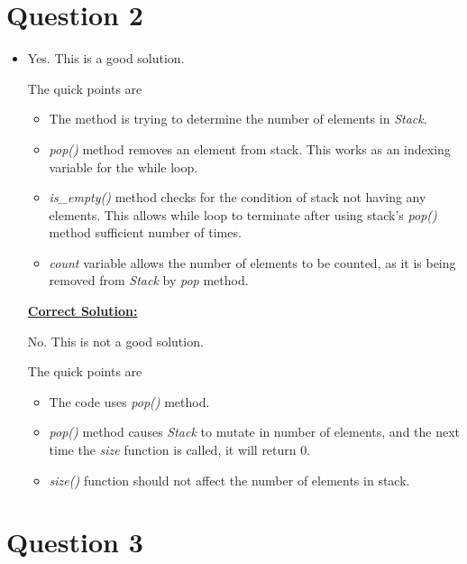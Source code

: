 \documentclass[12pt]{article}
\begin{document}
\section*{Question 2}
\begin{itemize}
    \item

    Yes. This is a good solution.

    \bigskip

    The quick points are

    \begin{itemize}
        \item The method is trying to determine the number of elements in \textit{Stack}.
        \item \textit{pop()} method removes an element from stack. This works as an indexing variable for the while loop.
        \item \textit{is\_empty()} method checks for the condition of stack not having any elements.
        This allows while loop to terminate after using stack's \textit{pop()} method sufficient number of times.
        \item \textit{count} variable allows the number of elements to be counted, as it is being
        removed from \textit{Stack} by \textit{pop} method.
    \end{itemize}

    \bigskip

    \begin{mdframed}
        \underline{\textbf{Correct Solution:}}

        \bigskip
        \color{red}
        No. This is not a good solution.
        \color{black}

        \bigskip

        The quick points are

        \color{red}
        \begin{itemize}
            \item The code uses \textit{pop()} method.
            \item \textit{pop()} method causes \textit{Stack} to mutate in
            number of elements, and the next time the \textit{size} function is called,
            it will return 0.
            \item \textit{size()} function should not affect the number of elements in stack.
        \end{itemize}
        \color{black}
    \end{mdframed}
\end{itemize}

\section*{Question 3}
\end{document}
